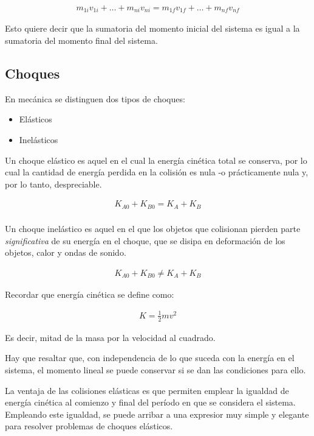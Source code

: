 \documentclass[12pt]{article}
\begin{document}
\begin{align*}
	m_{1i}v_{1i} + \dots + m_{ni}v_{ni} = m_{1f}v_{1f} + \dots + m_{nf}v_{nf}
\end{align*}

Esto quiere decir que la sumatoria del momento inicial del sistema es igual a la
sumatoria del momento final del sistema.

\subsection{Choques}

En mecánica se distinguen dos tipos de choques:
\begin{itemize}
	\item Elásticos
	\item Inelásticos
\end{itemize}

Un choque elástico es aquel en el cual la energía cinética total se
conserva, por lo cual la cantidad de energía perdida en la colisión es nula
-o prácticamente nula y, por lo tanto, despreciable.

\begin{align*}
	K_{A0} + K_{B0} = K_{A} + K_{B} \\
\end{align*}

Un choque inelástico es aquel en el que los objetos que colisionan pierden parte
\textit{significativa} de su energía en el choque,
que se disipa en deformación de los objetos,
calor y ondas de sonido.

\begin{align*}
	K_{A0} + K_{B0} \neq K_{A} + K_{B}
\end{align*}

Recordar que energía cinética se define como:

\begin{align*}
	K = \frac{1}{2}mv^{2}
\end{align*}

Es decir, mitad de la masa por la velocidad al cuadrado.

Hay que resaltar que,
con independencia de lo que suceda con la energía en el sistema,
el momento lineal se puede conservar si se dan las condiciones para ello.

La ventaja de las colisiones elásticas es que permiten emplear la igualdad de
energía cinética al comienzo y final del período en que se considera el sistema.
Empleando este igualdad, se puede arribar a una expresior muy simple y elegante
para resolver problemas de choques elásticos.
\end{document}
